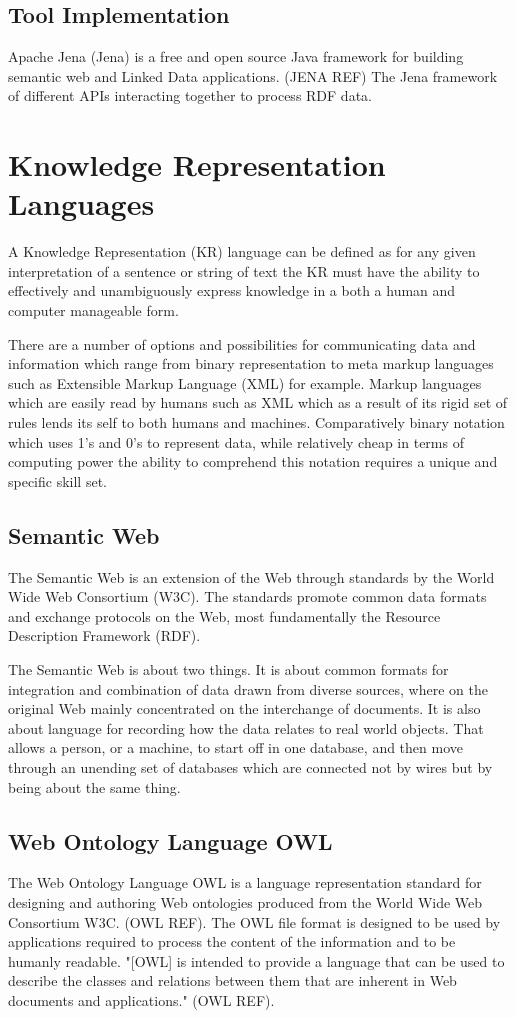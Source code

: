 \subsection{Tool Implementation}

Apache Jena (Jena) is a free and open source Java framework for building semantic web and Linked Data applications. (JENA REF) The Jena framework of different APIs interacting together to process RDF data.

\section{Knowledge Representation Languages}
A Knowledge Representation (KR) language can be defined as for any given interpretation of a sentence or string of text the KR must have the ability to effectively and unambiguously express knowledge in a both a human and computer manageable form. 

There are a number of options and possibilities for communicating data and information which range from binary representation to meta markup languages such as Extensible Markup Language (XML) for example. Markup languages which are easily read by humans such as XML which as a result of its rigid set of rules lends its self to both humans and machines. Comparatively binary notation which uses 1's and 0's to represent data, while relatively cheap in terms of computing power the ability to comprehend this notation requires a unique and specific skill set.

\subsection{Semantic Web}
The Semantic Web is an extension of the Web through standards by the World Wide Web Consortium (W3C). The standards promote common data formats and exchange protocols on the Web, most fundamentally the Resource Description Framework (RDF).

The Semantic Web is about two things. It is about common formats for integration and combination of data drawn from diverse sources, where on the original Web mainly concentrated on the interchange of documents. It is also about language for recording how the data relates to real world objects. That allows a person, or a machine, to start off in one database, and then move through an unending set of databases which are connected not by wires but by being about the same thing.

\subsection{Web Ontology Language OWL}\label{owl}
The Web Ontology Language OWL is a language representation standard for designing and authoring Web ontologies produced from the World Wide Web Consortium W3C. (OWL REF). The OWL file format is designed to be used by applications required to process the content of the information and to be humanly readable. "[OWL] is intended to provide a language that can be used to describe the classes and relations between them that are inherent in Web documents and applications." (OWL REF). 

